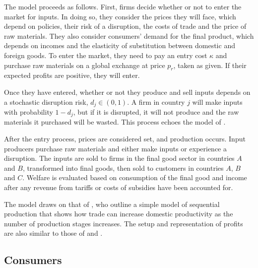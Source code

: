 \documentclass{article}
\begin{document}
The model proceeds as follows. First, firms decide whether or not to enter the market for inputs. In doing so, they consider the prices they will face, which depend on policies, their risk of a disruption, the costs of trade and the price of raw materials. They also consider consumers' demand for the final product, which depends on incomes and the elasticity of substitution between domestic and foreign goods. To enter the market, they need to pay an entry cost $\kappa$ and purchase raw materials on a global exchange at price $p_r$, taken as given. If their expected profits are positive, they will enter.

Once they have entered, whether or not they produce and sell inputs depends on a stochastic disruption risk, $d_j \in (0, 1)$. A firm in country $j$ will make inputs with probability $1 - d_j$, but if it is disrupted, it will not produce and the raw materials it purchased will be wasted. This process echoes the model of \textcite{bimpikis_supply_2019}.

After the entry process, prices are considered set, and production occurs. Input producers purchase raw materials and either make inputs or experience a disruption. The inputs are sold to firms in the final good sector in countries $A$ and $B$, transformed into final goods, then sold to customers in countries $A$, $B$ and $C$. Welfare is evaluated based on consumption of the final good and income after any revenue from tariffs or costs of subsidies have been accounted for.

The model draws on that of \textcite{melitz_missing_2014}, who outline a simple model of sequential production that shows how trade can increase domestic productivity as the number of production stages increases. The setup and representation of profits are also similar to those of \textcite{venables_trade_1987} and \textcite{bagwell_design_2016}.

\subsection{Consumers}
 
\end{document}
